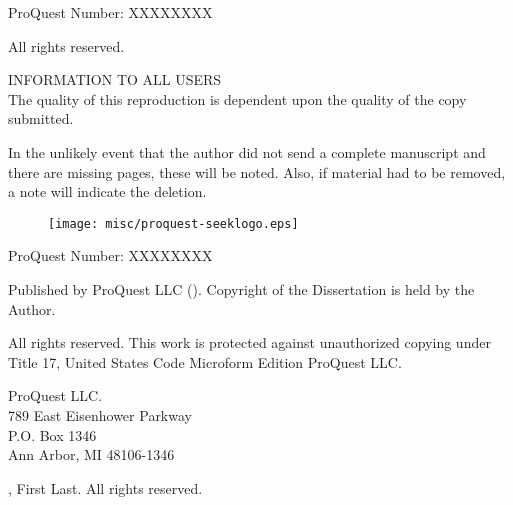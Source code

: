 \documentclass[12pt]{report}
\newcommand{\thesisname}{First Last}
\newcommand{\graddate}{\the\year} %
\begin{document}
\newpage



\thispagestyle{empty}
\begin{center}
ProQuest Number: XXXXXXXX

\vspace{.45in}

All rights reserved.

\vspace{.1in}

INFORMATION TO ALL USERS\\
The quality of this reproduction is dependent upon the quality of the copy submitted.
\vspace{.2in}

In the unlikely event that  the author did not send a complete manuscript and there are missing pages, these will be  noted. Also, if material had to be removed, a note will indicate the deletion.

\vspace{.1in}

\begin{figure}[H]
  \centering
  \texttt{[image: misc/proquest-seeklogo.eps]}
\end{figure}

\vspace{.1in}

ProQuest Number: XXXXXXXX

\vspace{.1in}

Published  by  ProQuest  LLC (\the\year).        Copyright of the Dissertation is held by the Author.

\vspace{.2in}

All rights reserved. This work is protected against  unauthorized copying under Title 17, United States Code Microform Edition {\textcopyright} ProQuest  LLC.

\vspace{.2in}

ProQuest LLC.\\
789 East Eisenhower Parkway\\
P.O. Box 1346\\
Ann Arbor, MI  48106-1346

\end{center}
\newpage

%
\setcounter{page}{2}
\thispagestyle{empty}
%
\begin{center}
{
  \vspace*{\fill}

  {\textcopyright} \graddate, \thesisname. All rights reserved.
}

\end{center}
\end{document}
